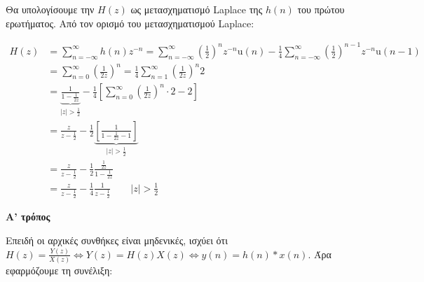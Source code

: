 \documentclass[11pt,a4paper,notitlepage,fleqn]{article}
\begin{document}
\begin{exercise}
\begin{enumpar}
	\item
	

	Θα υπολογίσουμε την \( H(z) \) ως μετασχηματισμό Laplace της \( h(n) \) του πρώτου ερωτήματος.
	Από τον ορισμό του μετασχηματισμού Laplace:
	
	\begin{align*}
		H(z) &= \sum_{n=-\infty}^{\infty} h(n)z^{-n} = \sum_{n=-\infty}^{\infty}\left(\frac{1}{2}\right)^n z^{-n}\mathrm{u}(n)
		-\frac{1}{4}\sum_{n=-\infty}^{\infty}\left(\frac{1}{2}\right)^{n-1}z^{-n}\mathrm{u}(n-1)
		\\ &= \sum_{n=0}^{\infty} \left(\frac{1}{2z}\right)^n = \frac{1}{4}\sum_{n=1}^{\infty}\left(\frac{1}{2z}\right)^n 2
		\\ &= \underbrace{\frac{1}{1-\frac{1}{2z}}}_{|z|>\frac{1}{2}}
		- \frac{1}{4}\left[\sum_{n=0}^{\infty} \left(\frac{1}{2z}\right)^n \cdot 2 - 2 \right]
		\\ &= \frac{z}{z-\frac{1}{2}}-\frac{1}{2}\underbrace{\left[
		\frac{1}{1-\frac{1}{2z}-1}
		\right]}_{|z|>\frac{1}{2}}
        \\ &= \frac{z}{z-\frac{1}{2}} -\frac{1}{2}\frac{\frac{1}{2z}}{1-\frac{1}{2z}}
        \\ &
        =\frac{z}{z-\frac{1}{2}} - \frac{1}{4}\frac{1}{z-\frac{1}{2}}\qquad |z|>\frac{1}{2}
	\end{align*}
	
    \item
	\begin{enumgreekpar}
	\item \textbf{Α' τρόπος}
	
	
	Επειδή οι αρχικές συνθήκες είναι μηδενικές, ισχύει ότι \( H(z) = \frac{Y(z)}{X(z)}\iff
	Y(z) = H(z)X(z) \iff y(n) = h(n)*x(n) \). Άρα εφαρμόζουμε τη συνέλιξη:
	

\end{enumgreekpar}
\end{enumpar}
\end{exercise}
\end{document}
